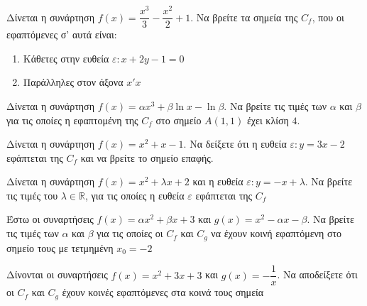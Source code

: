 \documentclass{presentation}
\begin{document}
\begin{askisi}
    Δίνεται η συνάρτηση $f(x)=\dfrac{x^3}{3}-\dfrac{x^2}{2}+1$. Να βρείτε τα σημεία της $C_f$, που οι εφαπτόμενες σ' αυτά είναι:
    \begin{enumerate}
        \item<1-> Κάθετες στην ευθεία $ε:x+2y-1=0$
        \item<2-> Παράλληλες στον άξονα $x'x$
    \end{enumerate}

\end{askisi}

\begin{askisi}
    Δίνεται η συνάρτηση $f(x)=αx^3+β\ln x-\ln β$. Να βρείτε τις τιμές των $α$ και $β$ για τις οποίες η εφαπτομένη της $C_f$ στο σημείο $Α(1,1)$ έχει κλίση $4$.

\end{askisi}

\begin{askisi}
    Δίνεται η συνάρτηση $f(x)=x^2+x-1$. Να δείξετε ότι η ευθεία $ε:y=3x-2$ εφάπτεται της $C_f$ και να βρείτε το σημείο επαφής.

\end{askisi}

\begin{askisi}
    Δίνεται η συνάρτηση $f(x)=x^2+λx+2$ και η ευθεία $ε:y=-x+λ$. Να βρείτε τις τιμές του $λ\in\mathbb{R}$, για τις οποίες η ευθεία $ε$ εφάπτεται της $C_f$

\end{askisi}

\begin{askisi}
    Έστω οι συναρτήσεις $f(x)=αx^2+βx+3$ και $g(x)=x^2-αx-β$. Να βρείτε τις τιμές των $α$ και $β$ για τις οποίες οι $C_f$ και $C_g$ να έχουν κοινή εφαπτόμενη στο σημείο τους με τετμημένη $x_0=-2$

\end{askisi}

\begin{askisi}
    Δίνονται οι συναρτήσεις $f(x)=x^2+3x+3$ και $g(x)=-\dfrac{1}{x}$. Να αποδείξετε ότι οι $C_f$ και $C_g$ έχουν κοινές εφαπτόμενες στα κοινά τους σημεία

\end{askisi}
\end{document}
